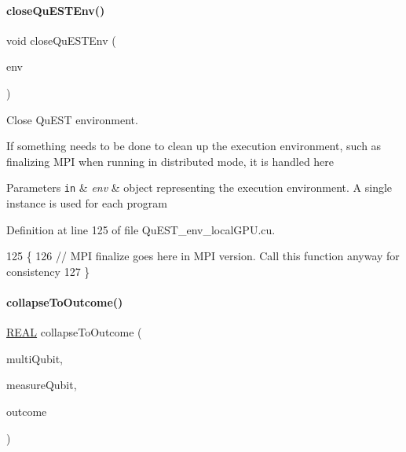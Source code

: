\mbox{\label{QuEST__env__localGPU_8cu_abd4bc926cd3f9b65610bb228d0c59fe0}} 
\paragraph{\texorpdfstring{close\+Qu\+E\+S\+T\+Env()}{closeQuESTEnv()}}
{\footnotesize\ttfamily void close\+Qu\+E\+S\+T\+Env (\begin{DoxyParamCaption}\item[{\mbox{\hyperlink{structQuESTEnv}{Qu\+E\+S\+T\+Env}}}]{env }\end{DoxyParamCaption})}



Close Qu\+E\+ST environment. 

If something needs to be done to clean up the execution environment, such as finalizing M\+PI when running in distributed mode, it is handled here


\begin{DoxyParams}[1]{Parameters}
\mbox{\tt in}  & {\em env} & object representing the execution environment. A single instance is used for each program \\
\hline
\end{DoxyParams}


Definition at line 125 of file Qu\+E\+S\+T\+\_\+env\+\_\+local\+G\+P\+U.\+cu.


\begin{DoxyCode}
125                                 \{
126     \textcolor{comment}{// MPI finalize goes here in MPI version. Call this function anyway for consistency}
127 \}
\end{DoxyCode}
\mbox{\label{QuEST__env__localGPU_8cu_a07418ebac70fd9ae5d051d089961631d}} 
\paragraph{\texorpdfstring{collapse\+To\+Outcome()}{collapseToOutcome()}}
{\footnotesize\ttfamily \mbox{\hyperlink{QuEST__precision_8h_a4b654506f18b8bfd61ad2a29a7e38c25}{R\+E\+AL}} collapse\+To\+Outcome (\begin{DoxyParamCaption}\item[{\mbox{\hyperlink{structMultiQubit}{Multi\+Qubit}}}]{multi\+Qubit,  }\item[{const int}]{measure\+Qubit,  }\item[{int}]{outcome }\end{DoxyParamCaption})}



